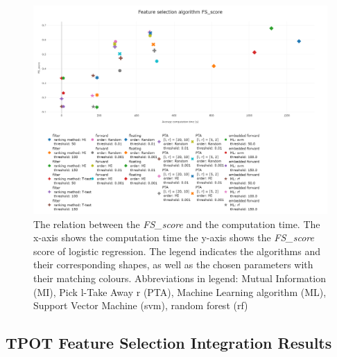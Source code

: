 \documentclass[10pt,a4paper]{report}
\begin{document}
	\begin{figure}[H]
		\centering
		\includegraphics[angle=90,height=1.4\textwidth]{Pareto_FSscore_Comp.png}
		\caption{The relation between the \textit{FS\_score} and the computation time. The x-axis shows the computation time the y-axis shows the \textit{FS\_score} score of logistic regression. The legend indicates the algorithms and their corresponding shapes, as well as the chosen parameters with their matching colours. Abbreviations in legend: Mutual Information (MI), Pick l-Take Away r (PTA), Machine Learning algorithm (ML), Support Vector Machine (svm), random forest (rf)}
		\label{fig:Comp_Time_FS_Acc}
	\end{figure}
	
	\subsection{TPOT Feature Selection Integration Results}
	
\end{document}
